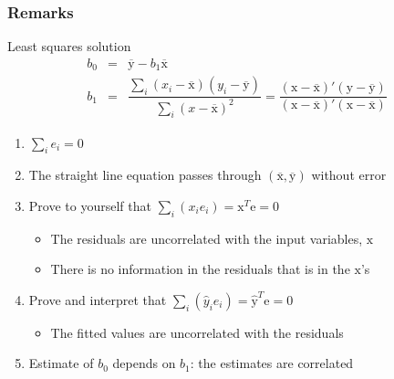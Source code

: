 \begin{frame}\frametitle{Remarks}
	\begin{block}{Least squares solution}
		$$
			\begin{array}{rcl}
				b_0 &=& \overline{\mathrm{y}} - b_1\overline{\mathrm{x}} \\
				b_1 &=& \dfrac{ \sum_i{\left(x_i - \overline{\mathrm{x}}\right)\left(y_i - \overline{\mathrm{y}}\right) } }{ \sum_i{\left( x - \overline{\mathrm{x}}\right)^2} } = \dfrac{\left(\mathrm{x} - \overline{\mathrm{x}}\right)'\left(\mathrm{y} - \overline{\mathrm{y}}\right)}{\left(\mathrm{x} - \overline{\mathrm{x}}\right)'\left(\mathrm{x} - \overline{\mathrm{x}}\right)}
			\end{array}
		$$
	\end{block}
	\begin{enumerate}
		\item	$\sum_i{e_i} = 0$
		\item	The straight line equation passes through $(\overline{\mathrm{x}}, \overline{\mathrm{y}})$ without error
		\item	Prove to yourself that $\sum_i{(x_i e_i)} = \mathrm{x}^T\mathrm{e} = 0$
		\begin{itemize}
			\item	The residuals are uncorrelated with the input variables, $\mathrm{x}$
			\item	There is no information in the residuals that is in the $\mathrm{x}$'s
		\end{itemize}
		\item	Prove and interpret that $\sum_i{(\hat{y}_i e_i)} = \hat{\mathrm{y}}^T\mathrm{e} = 0$
		\begin{itemize}
			\item	The fitted values are uncorrelated with the residuals
		\end{itemize}
		\item	Estimate of $b_0$ depends on $b_1$: the estimates are correlated
	\end{enumerate}
\end{frame}

